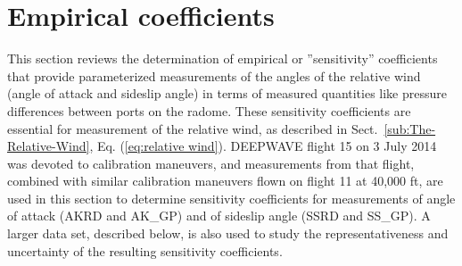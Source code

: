 \documentclass[12pt,twoside,english]{article}\usepackage[]{graphicx}\usepackage[]{color}
\let\stdsection\section
\renewcommand{\section}{\newpage\stdsection}
\let\OrgIndex\index
\renewcommand*{\index}[1]{\OrgIndex{#1}}
\begin{document}










\section{Empirical coefficients\label{sec:Calibrations}}

This section reviews the determination of empirical or ''sensitivity'' coefficients that provide parameterized measurements of the angles of the relative wind (angle of attack and sideslip angle) in terms of measured quantities like pressure differences between ports on the radome. These sensitivity coefficients are essential for measurement of the relative wind, as described in Sect.~\ref{sub:The-Relative-Wind}, Eq. (\ref{eq:relative wind}). DEEPWAVE flight 15 on 3 July 2014 was devoted to calibration maneuvers, and measurements from that flight, combined with similar calibration maneuvers flown on flight 11 at 40,000 ft, are used in this section to determine sensitivity coefficients for measurements of angle of attack (AKRD and AK\_GP) and of sideslip angle (SSRD and SS\_GP). A larger data set, described below, is also used to study the representativeness and uncertainty of the resulting sensitivity coefficients.
\end{document}
